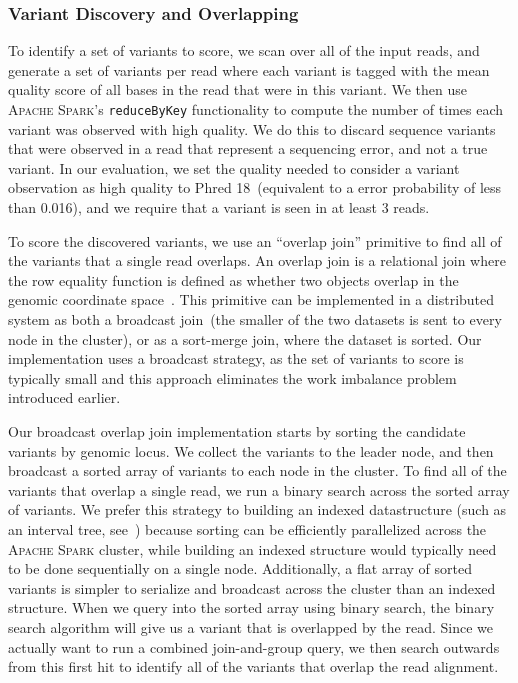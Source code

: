 \documentclass{bioinfo}
\begin{document}
\begin{methods}
\subsubsection{Variant Discovery and Overlapping}
\label{sec:discovery}

To identify a set of variants to score, we scan over all of the input reads,
and generate a set of variants per read where each variant is tagged with the
mean quality score of all bases in the read that were in this variant. We then
use \textsc{Apache Spark}'s \texttt{reduceByKey} functionality to compute
the number of times each variant was observed with high quality. We do this
to discard sequence variants that were observed in a read that represent a
sequencing error, and not a true variant. In our evaluation, we set the quality
needed to consider a variant observation as high quality to Phred 18~(equivalent
to a error probability of less than 0.016), and we require that a variant is
seen in at least 3 reads.

To score the discovered variants, we use an ``overlap join'' primitive to
find all of the variants that a single read overlaps. An overlap join is a
relational join where the row equality function is defined as whether two
objects overlap in the genomic coordinate space~\citep{nothaft15}. This
primitive can be implemented in a distributed system as both a broadcast
join~(the smaller of the two datasets is sent to every node in the cluster),
or as a sort-merge join, where the dataset is sorted. Our implementation
uses a broadcast strategy, as the set of variants to score is typically small
and this approach eliminates the work imbalance problem introduced earlier.

Our broadcast overlap join implementation starts by sorting the candidate
variants by genomic locus. We collect the variants to the leader node, and
then broadcast a sorted array of variants to each node in the cluster. To
find all of the variants that overlap a single read, we run a binary search
across the sorted array of variants. We prefer this strategy to building
an indexed datastructure (such as an interval tree, see~\citet{kozanitis16})
because sorting can be efficiently parallelized across the \textsc{Apache
Spark} cluster, while building an indexed structure would typically need to be
done sequentially on a single node. Additionally, a flat array of sorted
variants is simpler to serialize and broadcast across the cluster than an
indexed structure. When we query into the sorted array using binary search,
the binary search algorithm will give us a variant that is overlapped by
the read. Since we actually want to run a combined join-and-group query,
we then search outwards from this first hit to identify all of the variants
that overlap the read alignment.


\end{methods}
\end{document}
